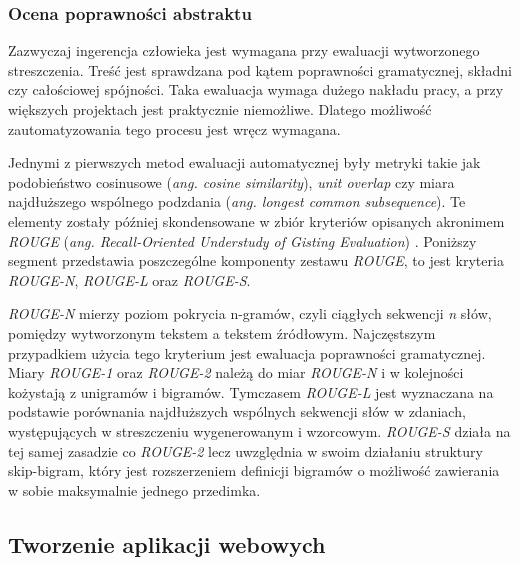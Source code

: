 \documentclass[12pt,a4paper,twoside]{article}
\begin{document}
\subsubsection{Ocena poprawności abstraktu}
Zazwyczaj ingerencja człowieka jest wymagana przy ewaluacji wytworzonego streszczenia. Treść jest sprawdzana pod kątem poprawności gramatycznej, składni czy całościowej spójności. Taka ewaluacja wymaga dużego nakładu pracy, a przy większych projektach jest praktycznie niemożliwe. Dlatego możliwość zautomatyzowania tego procesu jest wręcz wymagana.\par
Jednymi z pierwszych metod ewaluacji automatycznej były metryki takie jak podobieństwo cosinusowe (\textit{ang. cosine similarity}), \textit{unit overlap} czy miara najdłuższego wspólnego podzdania (\textit{ang. longest common subsequence}). Te elementy zostały później skondensowane w zbiór kryteriów opisanych akronimem \textit{ROUGE} (\textit{ang. Recall-Oriented Understudy of Gisting Evaluation}) \cite{rouge}. Poniższy segment przedstawia poszczególne komponenty zestawu \textit{ROUGE}, to jest kryteria \textit{ROUGE-N}, \textit{ROUGE-L} oraz \textit{ROUGE-S}.\par
\textit{ROUGE-N} mierzy poziom pokrycia n-gramów, czyli ciągłych sekwencji \textit{n} słów, pomiędzy wytworzonym tekstem a tekstem źródłowym. Najczęstszym przypadkiem użycia tego kryterium jest ewaluacja poprawności gramatycznej. Miary \textit{ROUGE-1} oraz \textit{ROUGE-2} należą do miar \textit{ROUGE-N} i w kolejności kożystają z unigramów i bigramów.
Tymczasem \textit{ROUGE-L} jest wyznaczana na podstawie porównania najdłuższych wspólnych sekwencji słów w zdaniach, występujących w streszczeniu wygenerowanym i wzorcowym. \textit{ROUGE-S} działa na tej samej zasadzie co \textit{ROUGE-2} lecz uwzględnia w swoim działaniu struktury skip-bigram, który jest rozszerzeniem definicji bigramów o możliwość zawierania w sobie maksymalnie jednego przedimka.
\subsection{Tworzenie aplikacji webowych}
{\color{blue}{(pomysł)}}\par
\end{document}

